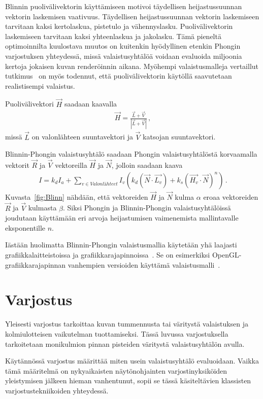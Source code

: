 \documentclass[finnish]{tktltiki2}
\theoremstyle{definition}
\theoremstyle{remark}
\begin{document}
Blinnin puolivälivektorin käyttämiseen motivoi täydellisen heijastussuunnan vektorin laskemisen vaativuus. Täydellisen heijastussuunnan vektorin laskemiseen tarvitaan kaksi kertolaskua, pistetulo ja vähennyslasku. Puolivälivektorin laskemiseen tarvitaan kaksi yhteenlaskua ja jakolasku. Tämä pieneltä optimoinnilta kuulostava muutos on kuitenkin hyödyllinen etenkin Phongin varjostuksen yhteydessä, missä valaistusyhtälöä voidaan evaluoida miljoonia kertoja jokaisen kuvan renderöinnin aikana. Myöhempi valaistusmalleja vertaillut tutkimus~\cite{Ngan} on myös todennut, että puolivälivektorin käytöllä saavutetaan realistisempi valaistus.

Puolivälivektori $\vec{H}$ saadaan kaavalla
\begin{align*}
\vec{H} = \frac{\vec{L} + \vec{V}}{\left|\vec{L} + \vec{V}\right|}\,,
\end{align*}
missä $\vec{L}$ on valonlähteen suuntavektori ja $\vec{V}$ katsojan suuntavektori.

Blinnin-Phongin valaistusyhtälö saadaan Phongin valaistusyhtälöstä korvaamalla vektorit $\vec{R}$ ja $\vec{V}$ vektoreilla $\vec{H}$ ja $\vec{N}$, jolloin saadaan kaava
\begin{align*}
I = k_dI_a + \sum\nolimits_{v \in Valonlähteet}I_v(k_d(\vec{N}\cdot\vec{L_v}) + k_s(\vec{H_v}\cdot\vec{N})^n)\,.
\end{align*}
Kuvasta~\ref{fig:Blinn} nähdään, että vektoreiden $\vec{H}$ ja $\vec{N}$ kulma $\alpha$ eroaa vektoreiden $\vec{R}$ ja $\vec{V}$ kulmasta $\beta$. Siksi Phongin ja Blinnin-Phongin valaistusyhtälöissä joudutaan käyttämään eri arvoja heijastumisen vaimenemista mallintavalle eksponentille $n$.

Iästään huolimatta Blinnin-Phongin valaistusmallia käytetään yhä laajasti grafiikkalaitteistoissa ja grafiikkarajapinnoissa~\cite{Hughes}. Se on esimerkiksi OpenGL-grafiikkarajapinnan vanhempien versioiden käyttämä valaistusmalli~\cite{OpenGL}.

\newpage
\section{Varjostus}
\label{sec:Varjostus}
Yleisesti varjostus tarkoittaa kuvan tummennusta tai väritystä valaistuksen ja kolmiulotteisen vaikutelman tuottamiseksi. Tässä luvussa varjostuksella tarkoitetaan monikulmion pinnan pisteiden väritystä valaistusyhtälön avulla.

Käytännössä varjostus määrittää miten usein valaistusyhtälö evaluoidaan. Vaikka tämä määritelmä on nykyaikaisten näytönohjainten varjostinyksiköiden yleistymisen jälkeen hieman vanhentunut, sopii se tässä käsiteltävien klassisten varjostustekniikoiden yhteydessä.
\end{document}
